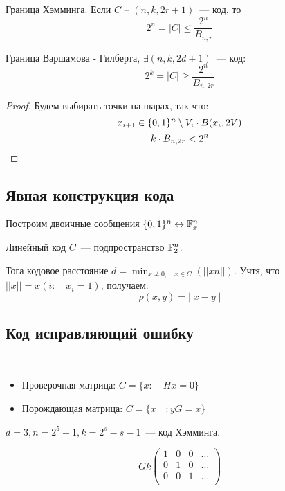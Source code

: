 \begin{definition}
  Граница Хэмминга. Если $C$ -- $(n, k, 2r + 1)$~--- код, то
  \[2^n = |C| \leq \frac{2^n}{B_{n, r}}\]
\end{definition}

\begin{definition}
  Граница Варшамова - Гилберта, $\exists (n, k, 2d + 1)$~--- код:
  \[2^k = |C| \geq \frac{2^n}{B_{n, 2r}}\]
\end{definition}

\begin{proof}
  Будем выбирать точки на шарах, так что:
  \[x_{i + 1} \in \{0, 1\}^n \setminus V_i \cdot B(x_i, 2V) \]
  \[k \cdot B_{n, 2r} < 2^n\]
\end{proof}

\subsection{Явная конструкция кода}

Построим двоичные сообщения $\{ 0, 1\}^n \leftrightarrow \mathbb{F}_x^n$

\begin{definition}
  Линейный код $C$~--- подпространство $\mathbb{F}_2^n$.
\end{definition}

Тога кодовое расстояние $d = \min_{x \neq 0, \quad x \in C}(||xn||)$. Учтя, что $||x|| = x(i: \quad  x_i = 1)$, получаем:
\[\rho(x, y)=  ||x - y|| \]
\subsection{Код исправляющий ошибку}

\begin{example}~
  \begin{itemize}
    \item Проверочная матрица: $C = \{ x: \quad Hx = 0\}$
    \item Порождающая матрица: $C = \{x \quad : yG = x\}$
  \end{itemize}
\end{example}

\begin{example}
  $d = 3, n = 2^5 - 1, k = 2^s - s - 1$~--- код Хэмминга.

  \[Gk 
  \begin{pmatrix}
    1 & 0 & 0 & \dots \\
  0 & 1 & 0 & \dots \\
  0 & 0 & 1 & \dots \\
  \end{pmatrix}
  \]

\end{example}

